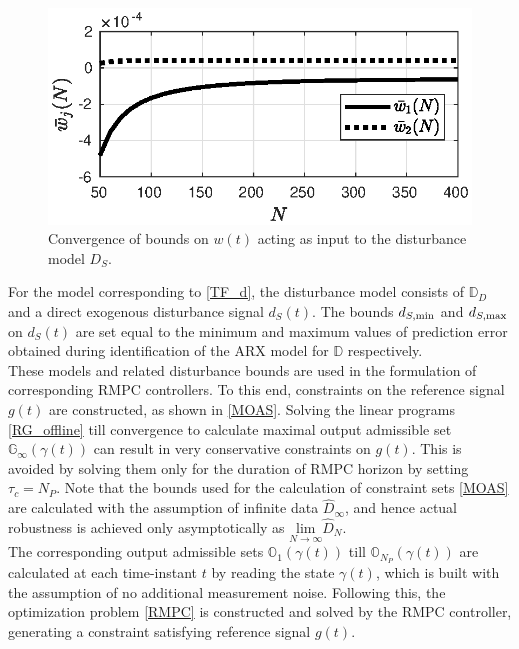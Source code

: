 \documentclass[letterpaper, 10 pt, conference]{ieeeconf}  %
\begin{document}
	\begin{figure}[h]
		\hspace{40pt}
		\includegraphics[scale = 0.50]{bounds_RG.eps}
		\caption{Convergence of bounds on $w(t)$ acting as input to the disturbance model $D_S$.}
		\label{bounds_RG}
	\end{figure} 
	For the model corresponding to \eqref{TF_d}, the disturbance model consists of $\mathbb{D}_D$ and a direct exogenous disturbance signal $d_S(t)$. The bounds $d_{S,{\rm min}}$ and $d_{S,{\rm max}}$ on $d_S(t)$ are set equal to the minimum and maximum values of prediction error obtained during identification of the ARX model for $\mathbb{D}$ respectively. \\
	These models and related disturbance bounds are used in the formulation of corresponding RMPC controllers. To this end, constraints on the reference signal $g(t)$ are constructed, as shown in \eqref{MOAS}. Solving the linear programs \eqref{RG_offline} till convergence to calculate maximal output admissible set $\mathbb{G}_{\infty}(\gamma(t))$ can result in very conservative constraints on $g(t)$. This is avoided by solving them only for the duration of RMPC horizon by setting $\tau_c = N_P$. Note that the bounds used for the calculation of constraint sets \eqref{MOAS} are calculated with the assumption of infinite data $\hat{D}_{\infty}$, and hence actual robustness is achieved only asymptotically as $\underset{N \rightarrow \infty}{\text{lim}} \hat{D}_N$.\\
	The corresponding output admissible sets $\mathbb{O}_{1}(\gamma(t))$ till $\mathbb{O}_{N_P}(\gamma(t))$ are calculated at each time-instant $t$ by reading the state $\gamma(t)$, which is built with the assumption of no additional measurement noise.
	Following this,
	the optimization problem \eqref{RMPC} is constructed and solved by the RMPC controller, generating a constraint satisfying reference signal $g(t)$.
\end{document}
